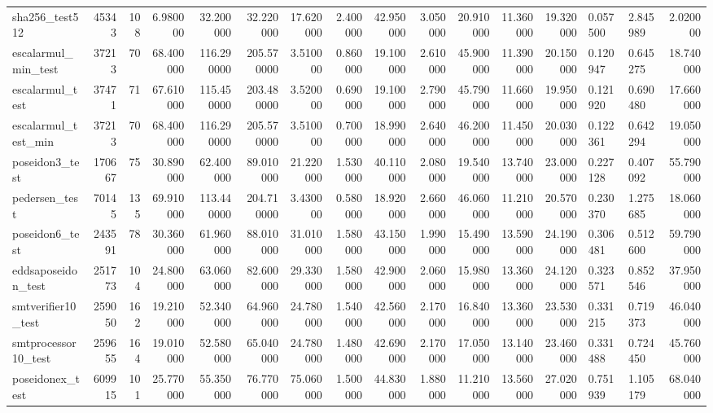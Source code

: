 \begin{tabular}{lrrrrrrrrrrrrllr}
sha256\_test512 & 45343 & 108 & 6.980000 & 32.200000 & 32.220000 & 17.620000 & 2.400000 & 42.950000 & 3.050000 & 20.910000 & 11.360000 & 19.320000 & 0.057500 & 2.845989 & 2.020000 \\
escalarmul\_min\_test & 37213 & 70 & 68.400000 & 116.290000 & 205.570000 & 3.510000 & 0.860000 & 19.100000 & 2.610000 & 45.900000 & 11.390000 & 20.150000 & 0.120947 & 0.645275 & 18.740000 \\
escalarmul\_test & 37471 & 71 & 67.610000 & 115.450000 & 203.480000 & 3.520000 & 0.690000 & 19.100000 & 2.790000 & 45.790000 & 11.660000 & 19.950000 & 0.121920 & 0.690480 & 17.660000 \\
escalarmul\_test\_min & 37213 & 70 & 68.400000 & 116.290000 & 205.570000 & 3.510000 & 0.700000 & 18.990000 & 2.640000 & 46.200000 & 11.450000 & 20.030000 & 0.122361 & 0.642294 & 19.050000 \\
poseidon3\_test & 170667 & 75 & 30.890000 & 62.400000 & 89.010000 & 21.220000 & 1.530000 & 40.110000 & 2.080000 & 19.540000 & 13.740000 & 23.000000 & 0.227128 & 0.407092 & 55.790000 \\
pedersen\_test & 70145 & 135 & 69.910000 & 113.440000 & 204.710000 & 3.430000 & 0.580000 & 18.920000 & 2.660000 & 46.060000 & 11.210000 & 20.570000 & 0.230370 & 1.275685 & 18.060000 \\
poseidon6\_test & 243591 & 78 & 30.360000 & 61.960000 & 88.010000 & 31.010000 & 1.580000 & 43.150000 & 1.990000 & 15.490000 & 13.590000 & 24.190000 & 0.306481 & 0.512600 & 59.790000 \\
eddsaposeidon\_test & 251773 & 104 & 24.800000 & 63.060000 & 82.600000 & 29.330000 & 1.580000 & 42.900000 & 2.060000 & 15.980000 & 13.360000 & 24.120000 & 0.323571 & 0.852546 & 37.950000 \\
smtverifier10\_test & 259050 & 162 & 19.210000 & 52.340000 & 64.960000 & 24.780000 & 1.540000 & 42.560000 & 2.170000 & 16.840000 & 13.360000 & 23.530000 & 0.331215 & 0.719373 & 46.040000 \\
smtprocessor10\_test & 259655 & 164 & 19.010000 & 52.580000 & 65.040000 & 24.780000 & 1.480000 & 42.690000 & 2.170000 & 17.050000 & 13.140000 & 23.460000 & 0.331488 & 0.724450 & 45.760000 \\
poseidonex\_test & 609915 & 101 & 25.770000 & 55.350000 & 76.770000 & 75.060000 & 1.500000 & 44.830000 & 1.880000 & 11.210000 & 13.560000 & 27.020000 & 0.751939 & 1.105179 & 68.040000 \\
\bottomrule
\end{tabular}
